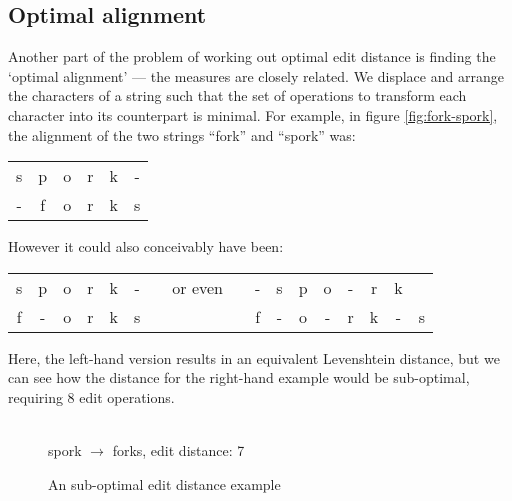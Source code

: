 \subsection*{Optimal alignment}
Another part of the problem of working out optimal edit distance is
finding the `optimal alignment' --- the measures are closely
related. We displace and arrange the characters of a string such that
the set of operations to transform each character into its counterpart
is minimal. For example, in figure \ref{fig:fork-spork}, the alignment
of the two strings ``fork'' and ``spork'' was:

\begin{center}
  \begin{tabular}{cccccc}
    s & p & o & r & k & -\\
    - & f & o & r & k & s 
  \end{tabular}
\end{center}

However it could also conceivably have been:

\begin{center}
  \begin{tabular}{ccccccccccccccccc}
    s & p & o & r & k & - & & or even & & - & s & p & o & - & r & k &\\
    f & - & o & r & k & s & &         & & f & - & o & - & r & k & - & s    
  \end{tabular}
\end{center}

Here, the left-hand version results in an equivalent Levenshtein
distance, but we can see how the distance for the right-hand example
would be sub-optimal, requiring 8 edit operations.

\begin{figure}[h]
  \centering   
  \\
  \vspace{3 mm}
  spork $\rightarrow$ forks, edit distance: 7
  \caption{An sub-optimal edit distance example}
  \label{fig:fork-spork-subopt}
\end{figure}

